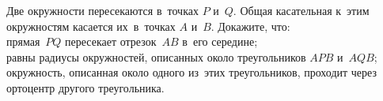 \begin{problems}
\item
Две окружности пересекаются в~точках $P$ и~$Q$.
Общая касательная к~этим окружностям касается их~в~точках $A$ и~$B$.
Докажите, что:
\\
\subproblem
прямая~$PQ$ пересекает отрезок~$AB$ в~его середине;
\\
\subproblem
равны радиусы окружностей, описанных около треугольников $APB$ и~$AQB$;
\\
\subproblem
окружность, описанная около одного из~этих треугольников, проходит через
ортоцентр другого треугольника.

\end{problems}


